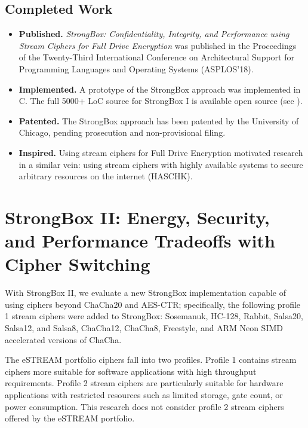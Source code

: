 \subsection{Completed Work}

\begin{itemize}
    \item \textbf{Published.} \textit{StrongBox: Confidentiality, Integrity, and
    Performance using Stream Ciphers for Full Drive Encryption} was published in
    the Proceedings of the Twenty-Third International Conference on
    Architectural Support for Programming Languages and Operating Systems
    (ASPLOS'18).

    \item \textbf{Implemented.} A prototype of the StrongBox approach was
    implemented in C. The full 5000+ LoC source for StrongBox I is available
    open source (see ).

    \item \textbf{Patented.} The StrongBox approach has been patented by the
    University of Chicago, pending prosecution and non-provisional filing.

    \item \textbf{Inspired.} Using stream ciphers for Full Drive Encryption
    motivated research in a similar vein: using stream ciphers with highly
    available systems to secure arbitrary resources on the internet (HASCHK).
\end{itemize}

\section{StrongBox II: Energy, Security, and Performance Tradeoffs with Cipher Switching}

With StrongBox II, we evaluate a new StrongBox implementation capable of using
ciphers beyond ChaCha20 and AES-CTR; specifically, the following profile 1
stream ciphers were added to StrongBox: Sosemanuk, HC-128, Rabbit, Salsa20,
Salsa12, and Salsa8, ChaCha12, ChaCha8, Freestyle, and ARM Neon SIMD accelerated
versions of ChaCha.

The eSTREAM portfolio ciphers fall into two profiles. Profile 1 contains stream
ciphers more suitable for software applications with high throughput
requirements. Profile 2 stream ciphers are particularly suitable for hardware
applications with restricted resources such as limited storage, gate count, or
power consumption. This research does not consider profile 2 stream ciphers
offered by the eSTREAM portfolio.

